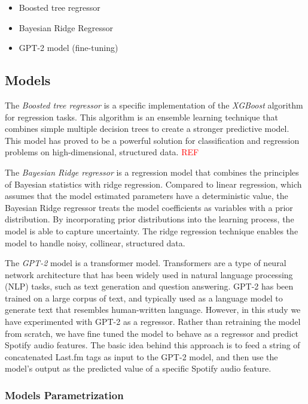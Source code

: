 \documentclass[sn-mathphys]{sn-jnl}%
\theoremstyle{thmstyleone}%
\theoremstyle{thmstyletwo}%
\theoremstyle{thmstylethree}%
\begin{document}
\begin{itemize}
      \item Boosted tree regressor \cite{xgboost}
      \item Bayesian Ridge Regressor \cite{bayesian}
      \item GPT-2 model (fine-tuning) \cite{radford2019language}
\end{itemize}


\subsection{Models}

The \emph{Boosted tree regressor} is a specific implementation of the \emph{XGBoost} algorithm for regression tasks.
This algorithm is an ensemble learning technique that combines simple multiple decision trees to
create a stronger predictive model.
This model has proved to be a powerful solution for classification and regression problems on high-dimensional, structured data.
\textcolor{red}{REF}

The \emph{Bayesian Ridge regressor} is a regression model that combines the principles of Bayesian statistics with ridge regression.
Compared to linear regression, which assumes that the model estimated parameters have a deterministic value, the Bayesian Ridge regressor treats the model coefficients as variables with a prior distribution.
By incorporating prior distributions into the learning process, the model is able to capture uncertainty.
The ridge regression technique enables the model to handle noisy, collinear, structured data.

The \emph{GPT-2} model is a transformer model.
Transformers are a type of neural network architecture that has been widely used in natural language processing (NLP) tasks,
such as text generation and question answering.
GPT-2 has been trained on a large corpus of text, and typically used as a language model to generate text that resembles human-written language.
However, in this study we have experimented with GPT-2 as a regressor.
Rather than retraining the model from scratch, we have fine tuned the model to behave as a regressor and  predict Spotify audio features.
The basic idea behind this approach is to feed a string of concatenated Last.fm tags as input to the GPT-2 model, and then use the model's output as the predicted value of a specific Spotify audio feature.

\subsubsection{Models Parametrization}
\end{document}
